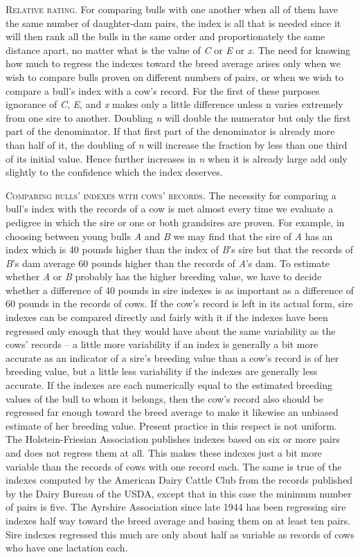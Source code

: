 \textsc{Relative rating}. For comparing bulls with one another when all
of them have the same number of daughter-dam pairs, the index is all
that is needed since it will then rank all the bulls in the same order and
proportionately the same distance apart, no matter what is the value of
\textit{C} or \textit{E} or \textit{x}. The need for knowing how much to
regress the indexes toward the breed average arises only when we wish to
compare bulls proven on different numbers of pairs, or when we wish to
compare a bull's index with a cow's record. For the first of these purposes
ignorance of \textit{C}, \textit{E}, and \textit{x} makes only a little
difference unless n varies extremely from one sire to another. Doubling
\textit{n} will double the numerator but only the first part of the
denominator. If that first part of the denominator is already more than
half of it, the doubling of \textit{n} will increase the fraction by less
than one third of its initial value. Hence further increases in \textit{n}
when it is already large add only slightly to the confidence which the index
deserves.

\textsc{Comparing bulls' indexes with cows' records}. The necessity for
comparing a bull's index with the records of a cow is met almost every
time we evaluate a pedigree in which the sire or one or both grandsires
are proven. For example, in choosing between young bulls \textit{A} and
\textit{B} we may find that the sire of \textit{A} has an index which
is 40 pounds higher than the index of \textit{B}'s sire but that the
records of \textit{B}'s dam average 60 pounds higher than the records of
\textit{A}'s dam. To estimate whether \textit{A} or \textit{B} probably
has the higher breeding value, we have to decide whether a difference of
40 pounds in sire indexes is as important as a difference of 60 pounds
in the records of cows. If the cow's record is left in its actual
form, sire indexes can be compared directly and fairly with it if the
indexes have been regressed only enough that they would have about
the same variability as the cows' records -- a little more variability if an
index is generally a bit more accurate as an indicator of a sire's breeding
value than a cow's record is of her breeding value, but a little less
variability if the indexes are generally less accurate. If the indexes are
each numerically equal to the estimated breeding values of the bull to
whom it belongs, then the cow's record also should be regressed far
enough toward the breed average to make it likewise an unbiased estimate
of her breeding value. Present practice in this respect is not uniform.
The Holstein-Friesian Association publishes indexes based on six
or more pairs and does not regress them at all. This makes these indexes
just a bit more variable than the records of cows with one record each.
The same is true of the indexes computed by the American Dairy Cattle
Club from the records published by the Dairy Bureau of the USDA,
except that in this case the minimum number of pairs is five. The Ayrshire
Association since late 1944 has been regressing sire indexes half
way toward the breed average and basing them on at least ten pairs.
Sire indexes regressed this much are only about half as variable as records
of cows who have one lactation each.

